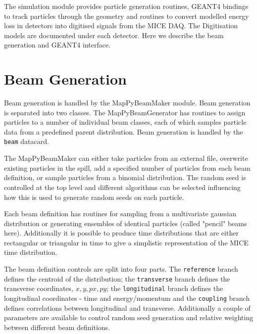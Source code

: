 The simulation module provides particle generation routines, GEANT4 bindings to track particles through the geometry and routines to convert modelled energy loss in detectors into digitised signals from the MICE DAQ. The Digitisation models are documented under each detector. Here we describe the beam generation and GEANT4 interface.

\section{Beam Generation}
Beam generation is handled by the MapPyBeamMaker module. Beam generation is separated into two classes. The MapPyBeamGenerator has routines to assign particles to a number of individual beam classes, each of which samples particle data from a predefined parent distribution. Beam generation is handled by the \verb|beam| datacard.

The MapPyBeamMaker can either take particles from an external file, overwrite existing particles in the spill, add a specified number of particles from each beam definition, or sample particles from a binomial distribution. The random seed is controlled at the top level and different algorithms can be selected influencing how this is used to generate random seeds on each particle. 

Each beam definition has routines for sampling from a multivariate gaussian distribution or generating ensembles of identical particles (called "pencil" beams here). Additionally it is possible to produce time distributions that are either rectangular or triangular in time to give a simplistic representation of the MICE time distribution.

The beam definition controls are split into four parts. The \verb|reference| branch defines the centroid of the distribution; the \verb|transverse| branch defines the transverse coordinates, $x, y, px, py$; the \verb|longitudinal| branch defines the longitudinal coordinates - time and energy/momentum and the \verb|coupling| branch defines correlations between longitudinal and transverse. Additionally a couple of parameters are available to control random seed generation and relative weighting between different beam definitions.

